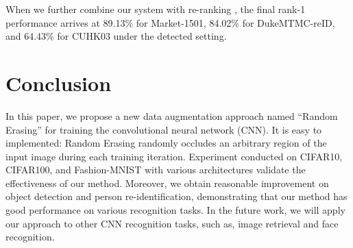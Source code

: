 \documentclass[10pt,twocolumn,letterpaper]{article}
\begin{document}
When we further combine our system with re-ranking  \cite{zhong2017re,bai2016sparse}, the final rank-1 performance arrives at 89.13\% for Market-1501, 84.02\% for DukeMTMC-reID, and 64.43\% for CUHK03 under the detected setting.








\section{Conclusion}
In this paper, we propose a new data augmentation approach named ``Random Erasing'' for training the convolutional neural network (CNN). It is easy to implemented: Random Erasing randomly occludes an arbitrary region of the input image during each training iteration. Experiment conducted on CIFAR10, CIFAR100, and Fashion-MNIST with various architectures validate the effectiveness of our method. Moreover, we obtain reasonable improvement on object detection and person re-identification, demonstrating that our method has good performance on various recognition tasks. In the future work, we will apply our approach to other CNN recognition tasks, such as, image retrieval and face recognition.

{\small


}
\end{document}
